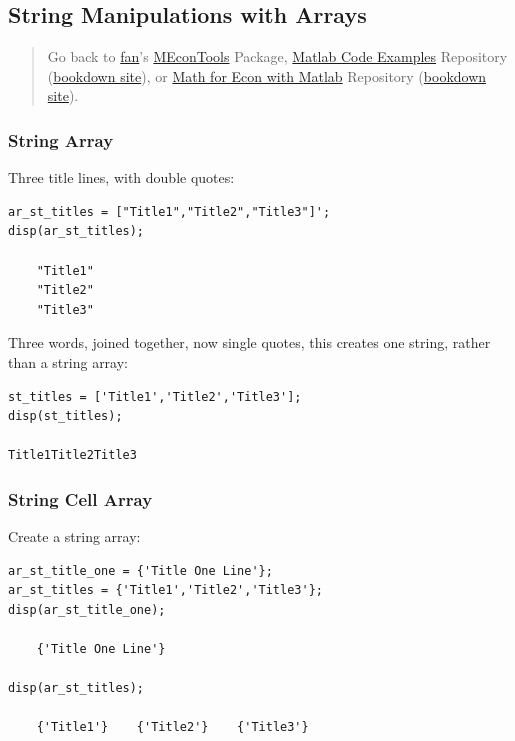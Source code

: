 \documentclass[
]{book}
\begin{document}
\hypertarget{string-manipulations-with-arrays}{%
\subsection{String Manipulations with Arrays}\label{string-manipulations-with-arrays}}

\begin{quote}
Go back to \href{http://fanwangecon.github.io/}{fan}'s \href{https://fanwangecon.github.io/MEconTools/}{MEconTools} Package, \href{https://fanwangecon.github.io/M4Econ/}{Matlab Code Examples} Repository (\href{https://fanwangecon.github.io/M4Econ/bookdown}{bookdown site}), or \href{https://fanwangecon.github.io/Math4Econ/}{Math for Econ with Matlab} Repository (\href{https://fanwangecon.github.io/Math4Econ/bookdown}{bookdown site}).
\end{quote}

\hypertarget{string-array}{%
\subsubsection{String Array}\label{string-array}}

Three title lines, with double quotes:

\begin{verbatim}
ar_st_titles = ["Title1","Title2","Title3"]';
disp(ar_st_titles);

    "Title1"
    "Title2"
    "Title3"
\end{verbatim}

Three words, joined together, now single quotes, this creates one
string, rather than a string array:

\begin{verbatim}
st_titles = ['Title1','Title2','Title3'];
disp(st_titles);

Title1Title2Title3
\end{verbatim}

\hypertarget{string-cell-array}{%
\subsubsection{String Cell Array}\label{string-cell-array}}

Create a string array:

\begin{verbatim}
ar_st_title_one = {'Title One Line'};
ar_st_titles = {'Title1','Title2','Title3'};
disp(ar_st_title_one);

    {'Title One Line'}

disp(ar_st_titles);

    {'Title1'}    {'Title2'}    {'Title3'}
\end{verbatim}
\end{document}
